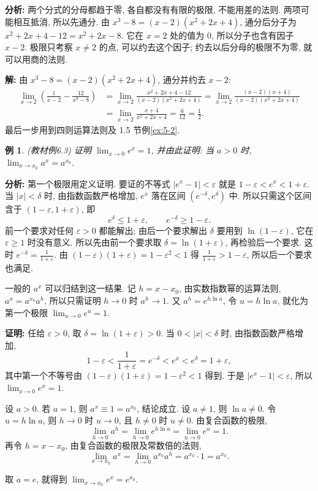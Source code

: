 \documentclass[UTF8,openany]{ctexbook}
\theoremstyle{chinesetextbook}
\newtheorem{example}{例}[section]
\newenvironment{cnproof}{\par\indent\textbf{证明:} \ignorespaces}{\par}
\newenvironment{cnsolution}{\par\indent\textbf{解:} \ignorespaces}{\par}
\begin{document}
\par\indent\textbf{分析:} 两个分式的分母都趋于零, 各自都没有有限的极限, 不能用差的法则. 两项可能相互抵消, 所以先通分. 由 $x^3-8=(x-2)(x^2+2x+4)$, 通分后分子为 $x^2+2x+4-12=x^2+2x-8$. 它在 $x=2$ 处的值为 $0$, 所以分子也含有因子 $x-2$. 极限只考察 $x\ne2$ 的点, 可以约去这个因子; 约去以后分母的极限不为零, 就可以用商的法则.
\begin{cnsolution}
由 $x^3-8=(x-2)(x^2+2x+4)$, 通分并约去 $x-2$:
\[
\begin{aligned}
\lim_{x\to2}\left(\frac1{x-2}-\frac{12}{x^3-8}\right)
&=\lim_{x\to2}\frac{x^2+2x+4-12}{(x-2)(x^2+2x+4)}=\lim_{x\to2}\frac{(x-2)(x+4)}{(x-2)(x^2+2x+4)}\\
&=\lim_{x\to2}\frac{x+4}{x^2+2x+4}=\frac6{12}=\frac12.
\end{aligned}
\]
最后一步用到四则运算法则及 1.5 节例\ref{ex:5-2}.
\end{cnsolution}
\begin{example}\label{ex:6-3}
\textnormal{(教材例6.3)} 证明 $\displaystyle\lim_{x\to0}e^x=1$, 并由此证明: 当 $a>0$ 时, $\displaystyle\lim_{x\to x_0}a^x=a^{x_0}$.
\end{example}
\par\indent\textbf{分析:} 第一个极限用定义证明. 要证的不等式 $|e^x-1|<\varepsilon$ 就是 $1-\varepsilon<e^x<1+\varepsilon$. 当 $|x|<\delta$ 时, 由指数函数严格增加, $e^x$ 落在区间 $(e^{-\delta},e^\delta)$ 中. 所以只需这个区间含于 $(1-\varepsilon,1+\varepsilon)$, 即
\[
e^\delta\le1+\varepsilon,\qquad e^{-\delta}\ge1-\varepsilon.
\]
前一个要求对任何 $\varepsilon>0$ 都能解出; 由后一个要求解出 $\delta$ 要用到 $\ln(1-\varepsilon)$, 它在 $\varepsilon\ge1$ 时没有意义. 所以先由前一个要求取 $\delta=\ln(1+\varepsilon)$, 再检验后一个要求. 这时 $\displaystyle e^{-\delta}=\frac1{1+\varepsilon}$. 由 $(1-\varepsilon)(1+\varepsilon)=1-\varepsilon^2<1$ 得 $\displaystyle\frac1{1+\varepsilon}>1-\varepsilon$, 所以后一个要求也满足.

一般的 $a^x$ 可以归结到这一结果. 记 $h=x-x_0$, 由实数指数幂的运算法则, $a^x=a^{x_0}a^h$, 所以只需证明 $h\to0$ 时 $a^h\to1$. 又 $a^h=e^{h\ln a}$, 令 $u=h\ln a$, 就化为第一个极限 $\displaystyle\lim_{u\to0}e^u=1$.
\begin{cnproof}
任给 $\varepsilon>0$, 取 $\delta=\ln(1+\varepsilon)>0$. 当 $0<|x|<\delta$ 时, 由指数函数严格增加,
\[
1-\varepsilon<\frac1{1+\varepsilon}=e^{-\delta}<e^x<e^\delta=1+\varepsilon,
\]
其中第一个不等号由 $(1-\varepsilon)(1+\varepsilon)=1-\varepsilon^2<1$ 得到. 于是 $|e^x-1|<\varepsilon$, 所以 $\displaystyle\lim_{x\to0}e^x=1$.

设 $a>0$. 若 $a=1$, 则 $a^x\equiv1=a^{x_0}$, 结论成立. 设 $a\ne1$, 则 $\ln a\ne0$. 令 $u=h\ln a$, 则 $h\to0$ 时 $u\to0$, 且 $h\ne0$ 时 $u\ne0$. 由复合函数的极限,
\[
\lim_{h\to0}a^h=\lim_{h\to0}e^{h\ln a}=\lim_{u\to0}e^u=1.
\]
再令 $h=x-x_0$, 由复合函数的极限及常数倍的法则,
\[
\lim_{x\to x_0}a^x=\lim_{h\to0}a^{x_0}a^h=a^{x_0}\cdot1=a^{x_0}.
\]
\end{cnproof}
取 $a=e$, 就得到 $\displaystyle\lim_{x\to x_0}e^x=e^{x_0}$.
\end{document}
